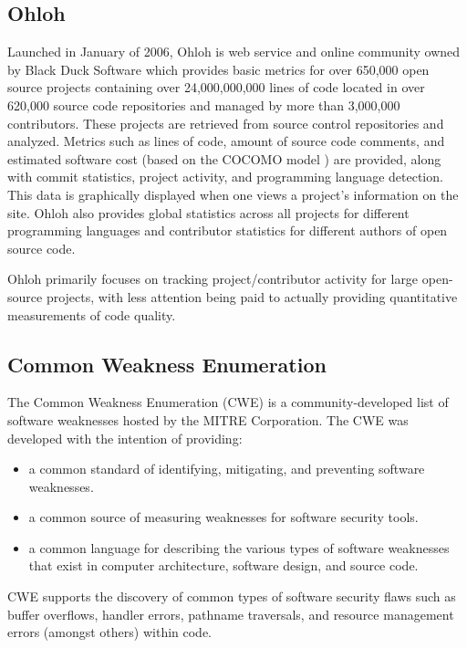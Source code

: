 \documentclass{sig-alternate}
\begin{document}
\subsection{Ohloh}
Launched in January of 2006, Ohloh \cite{allen2009ohloh} is web service and online community owned by Black Duck Software which provides basic metrics for over 650,000 open source projects containing over 24,000,000,000 lines of code located in over 620,000 source code repositories and managed by more than 3,000,000 contributors. These projects are retrieved from source control repositories and analyzed. Metrics such as lines of code, amount of source code comments, and estimated software cost (based on the COCOMO model \cite{boehm2000software}) are provided, along with commit statistics, project activity, and programming language detection. This data is graphically displayed when one views a project's information on the site. Ohloh also provides global statistics across all projects for different programming languages and contributor statistics for different authors of open source code. 

Ohloh primarily focuses on tracking project/contributor activity for large open-source projects, with less attention being paid to actually providing quantitative measurements of code quality.

\subsection{Common Weakness Enumeration}
The Common Weakness Enumeration (CWE) \cite{mitre2006cwe} is a community-developed list of software weaknesses hosted by the MITRE Corporation. The CWE was developed with the intention of providing:

\begin{itemize}
\item a common standard of identifying, mitigating, and preventing software weaknesses.
\item a common source of measuring weaknesses for software security tools.
\item a common language for describing the various types of software weaknesses that exist in computer architecture, software design, and source code.
\end{itemize}

CWE supports the discovery of common types of software security flaws such as buffer overflows, handler errors, pathname traversals, and resource management errors (amongst others) within code.
\end{document}
